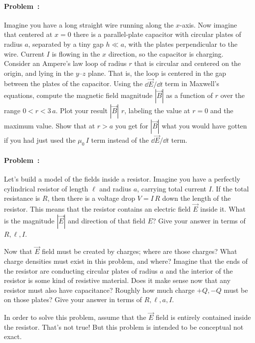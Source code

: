\documentclass[12pt]{article}
\begin{document}
\paragraph{Problem~\theproblem:}%
Imagine you have a long straight wire running along the $x$-axis.
Now imagine that centered at $x=0$ there is a parallel-plate capacitor
with circular plates of radius $a$, separated by a tiny gap $h\ll a$,
with the plates perpendicular to the wire.
Current $I$ is flowing in the $x$ direction, so the capacitor is charging.
Consider an Ampere's law loop of radius $r$ that is circular
and centered on the origin, and lying in the $y$--$z$ plane.
That is, the loop is centered in the gap between the plates of the capacitor.
Using the $\dd\vec{E}/\dd t$ term in Maxwell's equations,
compute the magnetic field magnitude $|\vec{B}|$ as a function of $r$ over
the range $0<r<3\,a$.
Plot your result $|\vec{B}|$  $r$, labeling the value at
$r=0$ and the maximum value.
Show that at $r>a$ you get for $|\vec{B}|$ what you would have gotten if you had just used
the $\mu_0\,I$ term instead of the $\dd\vec{E}/\dd t$ term.

\paragraph{Problem~\theproblem:}%
Let's build a model of the fields inside a resistor.
Imagine you have a perfectly cylindrical resistor of length $\ell$ and
radius $a$, carrying total current $I$. If the total resistance is $R$,
then there is a voltage drop $V=I\,R$ down the length of the resistor. This
means that the resistor contains an electric field $\vec{E}$ inside it. What is
the magnitude $|\vec{E}|$ and direction of that field $E$?
Give your answer in terms of $R, \ell, I$.

Now that $\vec{E}$ field must be created by charges; where are those charges?
What charge densities must exist in this problem, and where? Imagine that
the ends of the resistor are conducting circular plates of radius $a$ and
the interior of the resistor is some kind of resistive material. Does it
make sense now that any resistor must also have capacitance? Roughly how
much charge $+Q, -Q$ must be on those plates?
Give your answer in terms of $R, \ell, a, I$.

In order to solve this problem, assume that the $\vec{E}$ field is entirely
contained inside the resistor. That's not true! But this problem is intended
to be conceptual not exact.
\end{document}
